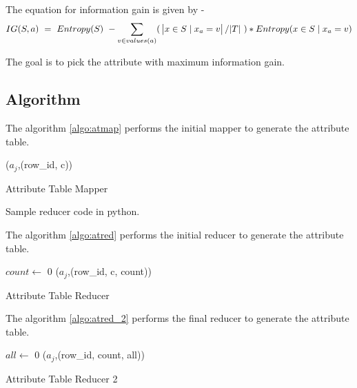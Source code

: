 \documentclass{article}
\begin{document}
The equation for information gain is given by -
\begin{equation}
IG(S, a)\ =\ Entropy(S)\ - \sum_{v \in values(a)}(\ \abs{x \in S\mid x_{a} = v}/\abs{T}\ ) * Entropy(x \in S\mid x_{a} = v)
\end{equation}

The goal is to pick the attribute with maximum information gain.

\subsection{Algorithm}

The algorithm \ref{algo:atmap} performs the initial mapper to generate the attribute table.

\IncMargin{1em}
\begin{algorithm}[H]
\DontPrintSemicolon
{}
\BlankLine
\emit(${a_{j}}$,(row\_id, c))
\caption{Attribute Table Mapper\label{algo:atmap}} Sample reducer code in python.
\end{algorithm}
\DecMargin{1em}

The algorithm \ref{algo:atred} performs the initial reducer to generate the attribute table.

\IncMargin{1em}
\begin{algorithm}[H]
\DontPrintSemicolon
{}
\BlankLine
$count\leftarrow$ 0\;
\emit(${a_{j}}$,(row\_id, c, count))
\caption{Attribute Table Reducer\label{algo:atred}}
\end{algorithm}
\DecMargin{1em}

The algorithm \ref{algo:atred_2} performs the final reducer to generate the attribute table.

\IncMargin{1em}
\begin{algorithm}[H]
\DontPrintSemicolon
{}
\BlankLine
$all\leftarrow$ 0\;
\emit(${a_{j}}$,(row\_id, count, all))
\caption{Attribute Table Reducer 2\label{algo:atred_2}}
\end{algorithm}
\DecMargin{1em}
\end{document}
